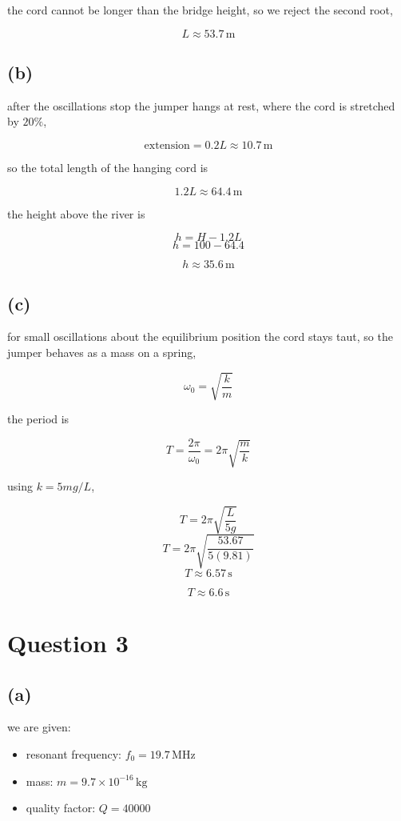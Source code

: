 \documentclass{article}
\begin{document}
the cord cannot be longer than the bridge height, so we reject the second root,

\[
\boxed{L\approx53.7\,\mathrm{m}}
\]

\subsection*{(b)}

after the oscillations stop the jumper hangs at rest, where the cord is stretched by $20\%$,

\[
\text{extension}=0.2L\approx10.7\,\mathrm{m}
\]

so the total length of the hanging cord is

\[
1.2L\approx64.4\,\mathrm{m}
\]

the height above the river is

\[
h=H-1.2L
\]
\[
h=100-64.4
\]

\[
\boxed{h\approx35.6\,\mathrm{m}}
\]

\subsection*{(c)}

for small oscillations about the equilibrium position the cord stays taut, so the jumper behaves as a mass on a spring,

\[
\omega_0=\sqrt{\frac{k}{m}}
\]

the period is

\[
T=\frac{2\pi}{\omega_0}=2\pi\sqrt{\frac{m}{k}}
\]

using $k=5mg/L$,

\[
T=2\pi\sqrt{\frac{L}{5g}}
\]
\[
T=2\pi\sqrt{\frac{53.67}{5(9.81)}}
\]
\[
T\approx6.57\,\mathrm{s}
\]

\[
\boxed{T\approx6.6\,\mathrm{s}}
\]

\section*{Question 3}

\subsection*{(a)}

we are given:

\begin{itemize}
    \item resonant frequency: $f_0=19.7\,\mathrm{MHz}$
    \item mass: $m=9.7\times10^{-16}\,\mathrm{kg}$
    \item quality factor: $Q=40000$
\end{itemize}
\end{document}
